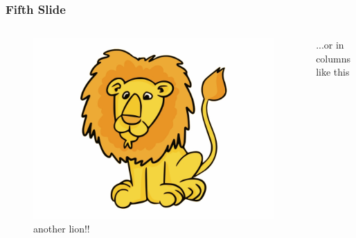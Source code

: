 \documentclass[11 pt, 
			   aspectratio=169
			   ]{beamer}
\begin{document}
\begin{frame}
	\frametitle{Fifth Slide}
	\begin{columns}
		\begin{figure}
			\includegraphics[height=0.5\textheight]{lion}
			\caption{another lion!!}
		\end{figure}
		...or in columns like this
	\end{columns}
\end{frame}
\end{document}
